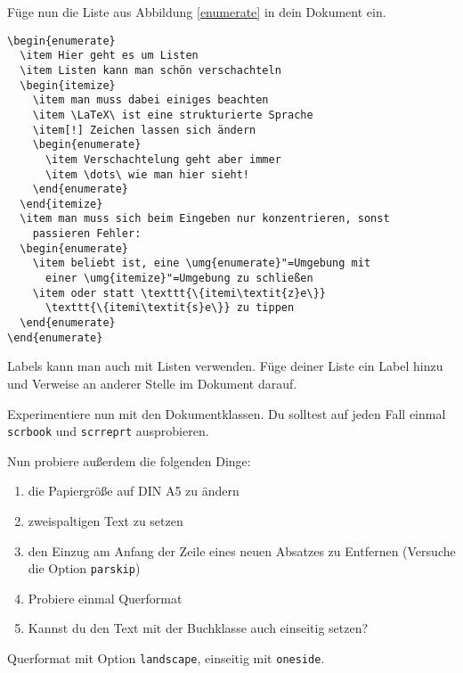 \begin{uebung}
\item Füge nun die Liste aus Abbildung \ref{enumerate} in dein Dokument ein.
    \begin{loesung}
\begin{verbatim}
\begin{enumerate}
  \item Hier geht es um Listen
  \item Listen kann man schön verschachteln
  \begin{itemize}
    \item man muss dabei einiges beachten
    \item \LaTeX\ ist eine strukturierte Sprache
    \item[!] Zeichen lassen sich ändern
    \begin{enumerate} 
      \item Verschachtelung geht aber immer
      \item \dots\ wie man hier sieht!
    \end{enumerate}
  \end{itemize}
  \item man muss sich beim Eingeben nur konzentrieren, sonst 
    passieren Fehler:
  \begin{enumerate}
    \item beliebt ist, eine \umg{enumerate}"=Umgebung mit 
      einer \umg{itemize}"=Umgebung zu schließen
    \item oder statt \texttt{\{itemi\textit{z}e\}} 
      \texttt{\{itemi\textit{s}e\}} zu tippen
  \end{enumerate}
\end{enumerate}
\end{verbatim}
    \end{loesung}

\item Labels kann man auch mit Listen verwenden. Füge deiner Liste ein Label
    hinzu und Verweise an anderer Stelle im Dokument darauf.

\item Experimentiere nun mit den Dokumentklassen. Du solltest auf jeden
    Fall einmal \texttt{scrbook} und \texttt{scrreprt} ausprobieren.
    
    Nun probiere außerdem die folgenden Dinge:
    \begin{enumerate}
        \item die Papiergröße auf DIN A5 zu ändern
        \item zweispaltigen Text zu setzen
        \item den Einzug am Anfang der Zeile eines neuen Absatzes zu
            Entfernen (Versuche die Option \texttt{parskip})
        \item Probiere einmal Querformat
        \item Kannst du den Text mit der Buchklasse auch einseitig setzen?
    \end{enumerate}
    \begin{loesung}
        Querformat mit Option \texttt{landscape}, einseitig mit \texttt{oneside}.
    \end{loesung}


\end{uebung}
